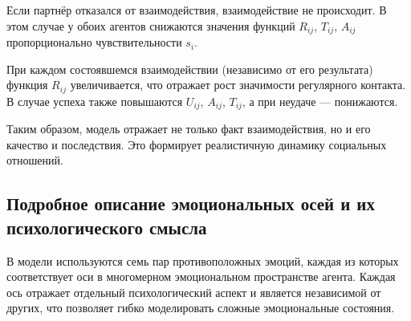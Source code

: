 \documentclass[12pt]{article}
\begin{document}
Если партнёр отказался от взаимодействия, взаимодействие не происходит.
В этом случае у обоих агентов снижаются значения функций \(R_{ij}\), \(T_{ij}\), \(A_{ij}\) пропорционально чувствительности \( s_i \).

При каждом состоявшемся взаимодействии (независимо от его результата) функция \(R_{ij}\) увеличивается, что отражает рост значимости регулярного контакта.
В случае успеха также повышаются \(U_{ij}\), \(A_{ij}\), \(T_{ij}\), а при неудаче — понижаются.

Таким образом, модель отражает не только факт взаимодействия, но и его качество и последствия.
Это формирует реалистичную динамику социальных отношений.
\subsection*{Подробное описание эмоциональных осей и их психологического смысла}

В модели используются семь пар противоположных эмоций, каждая из которых соответствует оси в многомерном эмоциональном пространстве агента. Каждая ось отражает отдельный психологический аспект и является независимой от других, что позволяет гибко моделировать сложные эмоциональные состояния.
\end{document}
